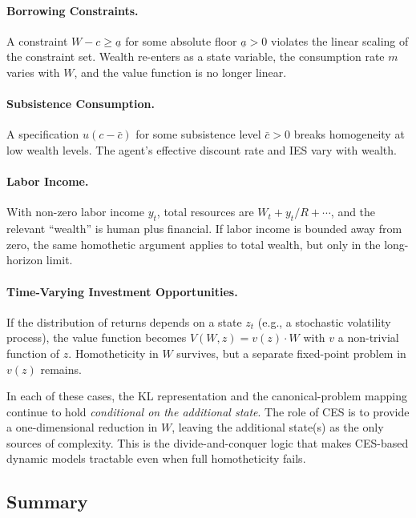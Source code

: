 \paragraph{Borrowing Constraints.}
A constraint $W - c \geq \underline{a}$ for some absolute floor $\underline{a} > 0$ violates the linear scaling of the constraint set. Wealth re-enters as a state variable, the consumption rate $m$ varies with $W$, and the value function is no longer linear.

\paragraph{Subsistence Consumption.}
A specification $u(c - \bar{c})$ for some subsistence level $\bar{c} > 0$ breaks homogeneity at low wealth levels. The agent's effective discount rate and IES vary with wealth.

\paragraph{Labor Income.}
With non-zero labor income $y_t$, total resources are $W_t + y_t/R + \cdots$, and the relevant ``wealth'' is human plus financial. If labor income is bounded away from zero, the same homothetic argument applies to total wealth, but only in the long-horizon limit.

\paragraph{Time-Varying Investment Opportunities.}
If the distribution of returns depends on a state $z_t$ (e.g., a stochastic volatility process), the value function becomes $V(W, z) = v(z) \cdot W$ with $v$ a non-trivial function of $z$. Homotheticity in $W$ survives, but a separate fixed-point problem in $v(z)$ remains.

\begin{calloutnote}
In each of these cases, the KL representation and the canonical-problem mapping continue to hold \emph{conditional on the additional state}. The role of CES is to provide a one-dimensional reduction in $W$, leaving the additional state(s) as the only sources of complexity. This is the divide-and-conquer logic that makes CES-based dynamic models tractable even when full homotheticity fails.
\end{calloutnote}

\subsection{Summary}
\label{subsec:dp-homothetic-summary}

